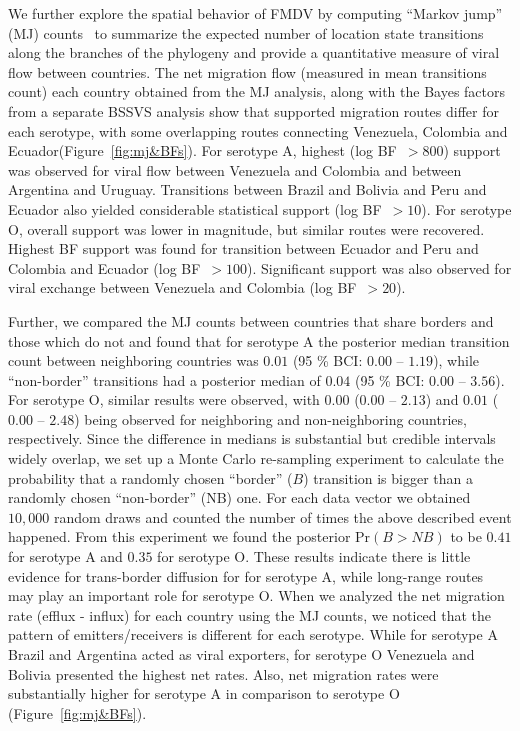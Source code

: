 \documentclass[10pt]{article}
\begin{document}
We further explore the spatial behavior of FMDV by  computing ``Markov jump'' (MJ) counts~\cite{Minin2008} to summarize the expected number of location state transitions along the branches of the phylogeny and provide a quantitative measure of viral flow between countries.
The net migration flow (measured in mean transitions count) each country obtained from the MJ analysis, along with the Bayes factors from a separate BSSVS analysis show that supported migration routes differ for each serotype, with some overlapping routes connecting Venezuela, Colombia and Ecuador(Figure~\ref{fig:mj&BFs}). 
For serotype A, highest (log BF~$>800$) support was observed for viral flow between Venezuela and Colombia and between Argentina and Uruguay.
Transitions between Brazil and Bolivia and Peru and Ecuador also yielded considerable statistical support (log BF~$>10$).
For serotype O, overall support was lower in magnitude, but similar routes were recovered.
Highest BF support was found for transition between Ecuador and Peru and Colombia and Ecuador (log BF~$>100$).
Significant support was also observed for viral exchange between Venezuela and Colombia (log BF~$>20$). 

Further, we compared the MJ counts between countries that share borders and those which do not and found that for serotype A the posterior median transition count between neighboring countries was $0.01$ (95 \% BCI: $0.00$ -- $1.19$), while ``non-border'' transitions had a posterior median of $0.04$ (95 \% BCI: $0.00$ --  $3.56$).
For serotype O, similar results were observed, with $0.00$ ($0.00$ -- $2.13$) and $0.01$ ($0.00$ -- $2.48$) being observed for neighboring and non-neighboring countries, respectively.
Since the difference in medians is substantial but credible intervals widely overlap, we set up a Monte Carlo re-sampling experiment to calculate the probability that a randomly chosen ``border'' ($B$) transition is bigger than a randomly chosen ``non-border'' (NB) one.
For each data vector we obtained $10,000$ random draws and counted the number of times the above described event happened.
From this experiment we found the posterior $\mbox{Pr}(B>NB)$  to be $0.41$ for serotype A and $0.35$ for serotype O.
These results indicate there is little evidence for trans-border diffusion  for for serotype A, while long-range routes may play an important role for serotype O.
When we analyzed the net migration rate (efflux - influx) for each country using the MJ counts, we noticed that the pattern of emitters/receivers is different for each serotype.
While for serotype A Brazil and Argentina acted as viral exporters, for serotype O Venezuela and Bolivia presented the highest net rates.
Also, net migration rates were substantially higher for serotype A in comparison to serotype O (Figure~\ref{fig:mj&BFs}).
\end{document}

